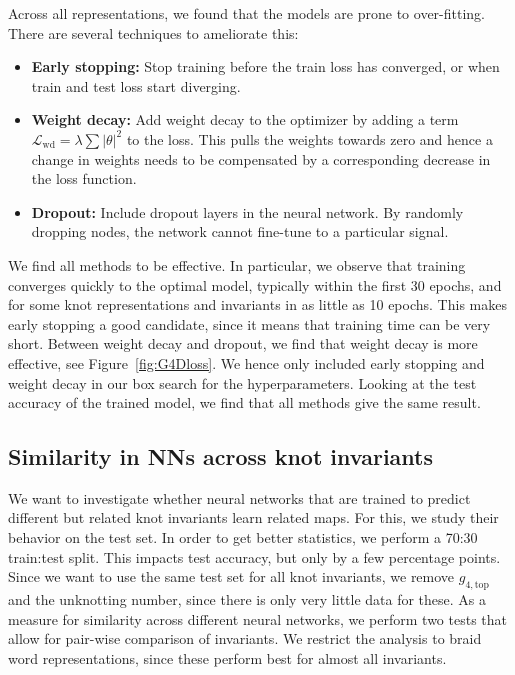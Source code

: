 \documentclass[11pt]{article}
\numberwithin{equation}{section}
\begin{document}
Across all representations, we found that the models are prone to over-fitting. There are several techniques to ameliorate this:
\begin{itemize}
    \item \textbf{Early stopping:} Stop training before the train loss has converged, or when train and test loss start diverging.
    \item \textbf{Weight decay:} Add weight decay to the optimizer by adding a term $\mathcal{L}_\text{wd}=\lambda\sum|\theta|^2$ to the loss. This pulls the weights towards zero and hence a change in weights needs to be compensated by a corresponding decrease in the loss function.
    \item \textbf{Dropout:} Include dropout layers in the neural network. By randomly dropping nodes, the network cannot fine-tune to a particular signal. 
\end{itemize}
We find all methods to be effective. In particular, we observe that training converges quickly to the optimal model, typically within the first 30 epochs, and for some knot representations and invariants in as little as 10 epochs. This makes early stopping a good candidate, since it means that training time can be very short. Between weight decay and dropout, we find that weight decay is more effective, see Figure~\ref{fig:G4Dloss}. We hence only included early stopping and weight decay in our box search for the hyperparameters. Looking at the test accuracy of the trained model, we find that all methods give the same result.

\subsection{Similarity in NNs across knot invariants}
\label{sec:Similarity}
We want to investigate whether neural networks that are trained to predict different but related knot invariants learn related maps. For this, we study their behavior on the test set. In order to get better statistics, we perform a 70:30 train:test split. This impacts test accuracy, but only by a few percentage points. Since we want to use the same test set for all knot invariants, we remove $g_{4,\text{top}}$ and the unknotting number, since there is only very little data for these. As a measure for similarity across different neural networks, we perform two tests that allow for pair-wise comparison of invariants. We restrict the analysis to braid word representations, since these perform best for almost all invariants.
\end{document}
